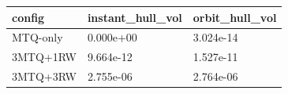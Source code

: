 \begin{tabular}{lll}
\hline
config & instant\_hull\_vol & orbit\_hull\_vol \\
\hline
MTQ-only & 0.000e+00 & 3.024e-14 \\
3MTQ+1RW & 9.664e-12 & 1.527e-11 \\
3MTQ+3RW & 2.755e-06 & 2.764e-06 \\
\hline
\end{tabular}
